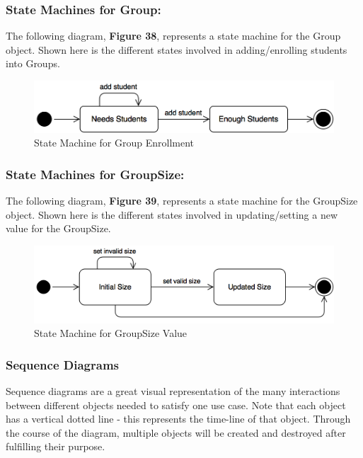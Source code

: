 \documentclass[12pt,letterpaper]{article}
\begin{document}
\subsubsection*{State Machines for Group:}

The following diagram, {\bf Figure 38}, represents a state machine for the Group object. Shown here is the different states involved in adding/enrolling students into Groups.

\begin{figure}[H]
	\centering{}
	\includegraphics[scale=0.3]{imgs/state/group-enrollment.png}
	\caption{State Machine for Group Enrollment}
\end{figure}

\subsubsection*{State Machines for GroupSize:}

The following diagram, {\bf Figure 39}, represents a state machine for the GroupSize object. Shown here is the different states involved in updating/setting a new value for the GroupSize.

\begin{figure}[H]
	\centering{}
	\includegraphics[scale=0.3]{imgs/state/group-size-value.png}
	\caption{State Machine for GroupSize Value}
\end{figure}

\subsubsection*{Sequence Diagrams}

Sequence diagrams are a great visual representation of the many interactions between different objects needed to satisfy one use case. Note that
each object has a vertical dotted line - this represents the time-line of that object. Through the course of the diagram, multiple objects will be created
and destroyed after fulfilling their purpose.
\end{document}
